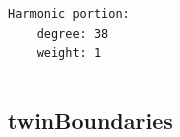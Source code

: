 \documentclass[compress]{beamer}
\begin{document}
\begin{frame}[fragile]
\begin{overlayarea}{\textwidth}{0.61\textheight}
\begin{columns}
\begin{column}{0.4\textwidth}
\begin{onlyenv}
\begin{lstlisting}[style=output]
  Harmonic portion:
    degree: 38
    weight: 1
          \end{lstlisting}
        \end{onlyenv}
\end{column}
\end{columns}

\end{overlayarea}

\begin{overlayarea}{\textwidth}{0.4\textheight}
\end{overlayarea}

\end{frame}

\subsection*{twinBoundaries}
\end{document}
